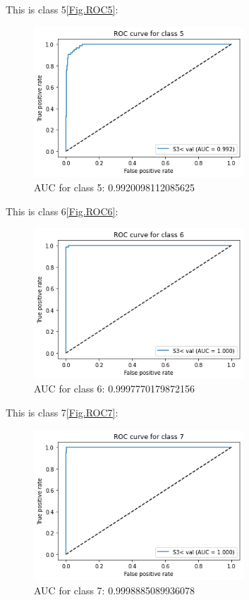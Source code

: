 \documentclass[conference]{IEEEtran}
\begin{document}
This is class 5\ref{Fig.ROC5}:
\begin{figure}[H] 
    \centering %
    \includegraphics[width=0.7\textwidth]{3ROC5.png} %
    \caption{AUC for class 5:  0.9920098112085625} %
    \label{Fig.3ROC5} %
\end{figure}
This is class 6\ref{Fig.ROC6}:
\begin{figure}[H] 
    \centering %
    \includegraphics[width=0.7\textwidth]{3ROC6.png} %
    \caption{AUC for class 6:  0.9997770179872156} %
    \label{Fig.3ROC6} %
\end{figure}
This is class 7\ref{Fig.ROC7}:
\begin{figure}[H] 
    \centering %
    \includegraphics[width=0.7\textwidth]{3ROC7.png} %
    \caption{AUC for class 7:  0.9998885089936078} %
    \label{Fig.3ROC7} %
\end{figure}
\end{document}
